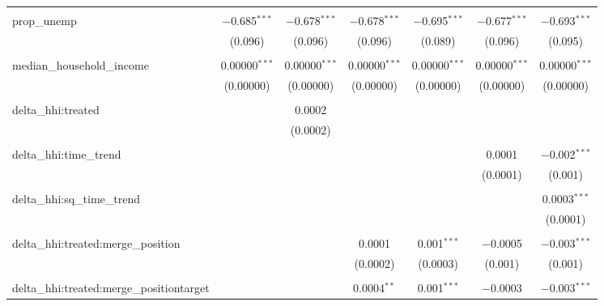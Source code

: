 \begin{table}[H]
{\begin{tabular}{@{\extracolsep{5pt}}lcccccc}
   & & & & & & \\  

  prop\_unemp & $-$0.685$^{***}$ & $-$0.678$^{***}$ & $-$0.678$^{***}$ & $-$0.695$^{***}$ & $-$0.677$^{***}$ & $-$0.693$^{***}$ \\  

   & (0.096) & (0.096) & (0.096) & (0.089) & (0.096) & (0.095) \\  

   & & & & & & \\  

  median\_household\_income & 0.00000$^{***}$ & 0.00000$^{***}$ & 0.00000$^{***}$ & 0.00000$^{***}$ & 0.00000$^{***}$ & 0.00000$^{***}$ \\  

   & (0.00000) & (0.00000) & (0.00000) & (0.00000) & (0.00000) & (0.00000) \\  

   & & & & & & \\  

  delta\_hhi:treated &  & 0.0002 &  &  &  &  \\  

   &  & (0.0002) &  &  &  &  \\  

   & & & & & & \\  

  delta\_hhi:time\_trend &  &  &  &  & 0.0001 & $-$0.002$^{***}$ \\  

   &  &  &  &  & (0.0001) & (0.001) \\  

   & & & & & & \\  

  delta\_hhi:sq\_time\_trend &  &  &  &  &  & 0.0003$^{***}$ \\  

   &  &  &  &  &  & (0.0001) \\  

   & & & & & & \\  

  delta\_hhi:treated:merge\_position &  &  & 0.0001 & 0.001$^{***}$ & $-$0.0005 & $-$0.003$^{***}$ \\  

   &  &  & (0.0002) & (0.0003) & (0.001) & (0.001) \\  

   & & & & & & \\  

  delta\_hhi:treated:merge\_positiontarget &  &  & 0.0004$^{**}$ & 0.001$^{***}$ & $-$0.0003 & $-$0.003$^{***}$ \\  


\end{tabular}}
\end{table}
